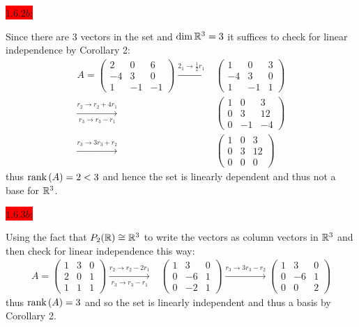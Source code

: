 \documentclass{exam}
\begin{document}
  \colorbox{red}{\underline{$1.6.2b$}:}
  \begin{solution}
    Since there are $3$ vectors in the set and $\dim \mathbb R^3 = 3$ it suffices to check for linear independence by Corollary 2:
    \begin{align*}
      A = \begin{pmatrix}
        2 & 0 & 6 \\
        -4 & 3 & 0 \\
        1 & -1 & -1
      \end{pmatrix}
      \xrightarrow{2_1 \to \frac{1}{2}r_1}
      &\begin{pmatrix}
        1 & 0 & 3 \\
        -4 & 3 & 0 \\
        1 & -1 & 1 
      \end{pmatrix} \\
      \xrightarrow[r_3 \to r_3 - r_1]{r_2 \to r_2 + 4r_1}
      &\begin{pmatrix}
        1 & 0 & 3 \\
        0 & 3 & 12 \\
        0 & -1 & -4  
      \end{pmatrix} \\
      \xrightarrow{r_3 \to 3r_3 + r_2} 
      &\begin{pmatrix}
        1 & 0 & 3 \\
        0 & 3 & 12 \\
        0 & 0 & 0
      \end{pmatrix}
    \end{align*} 
    thus $\text{rank}\left(A\right) = 2 < 3$ and hence the set is linearly dependent and thus not a base for $\mathbb R^3$.
  \end{solution}

  \colorbox{red}{\underline{$1.6.3b$}:}
  \begin{solution}
    Using the fact that $P_2(\mathbb R) \cong \mathbb R^3$ to write the vectors as column vectors in $\mathbb R^3$ and then check for linear independence this way:
    \begin{align*}
      A = \begin{pmatrix}
        1 & 3 & 0 \\
        2 & 0 & 1 \\
        1 & 1 & 1
      \end{pmatrix}
      \xrightarrow[r_3 \to r_3 - r_1]{r_2 \to r_2 - 2r_1}
      &\begin{pmatrix}
        1 & 3 & 0 \\
        0 & -6 & 1 \\
        0 & -2 & 1 
      \end{pmatrix}
      \xrightarrow{r_3 \to 3r_3 - r_2}
      \begin{pmatrix}
        1 & 3 & 0\\
        0 & -6 & 1 \\
        0 & 0 & 2
      \end{pmatrix}
    \end{align*}
    thus $\text{rank}\left(A\right) = 3$ and so the set is linearly independent and thus a basis by Corollary 2.
  \end{solution}
\end{document}
